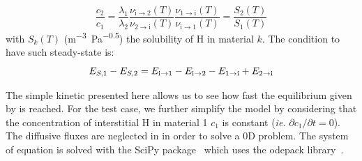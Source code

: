 \begin{equation}
     \frac{c_2}{c_1}=\frac{\lambda_1}{\lambda_2}\frac{\nu_\mathrm{i\rightarrow2}(T)}{\nu_\mathrm{2\rightarrow i}(T)}\frac{\nu_\mathrm{1\rightarrow i}(T)}{\nu_\mathrm{i\rightarrow 1}(T)} = \frac{S_2(T)}{S_1(T)}
\end{equation}
with $S_k(T)$ (\si{m^{-3}.Pa^{-0.5}}) the solubility of H in material $k$.
The condition to have such steady-state is:
\begin{equation}
    E_{S,1}-E_{S,2} = E_\mathrm{i\rightarrow 1}-E_\mathrm{i\rightarrow 2}-E_\mathrm{1\rightarrow i} +E_\mathrm{2\rightarrow i}
    \labeq{steady}
\end{equation}

\indent The simple kinetic presented here allows us to see how fast the equilibrium given by  is reached.
For the test case, we further simplify the model by considering that the concentration of interstitial H in material 1 $c_1$ is constant (\textit{ie.} $\partial c_1/\partial t=0$).
The diffusive fluxes are neglected in  in order to solve a 0D problem.
The system of equation is solved with the SciPy package~\cite{virtanen_scipy_2020} which uses the odepack library~\cite{hindmarch_odepack_1982}.

